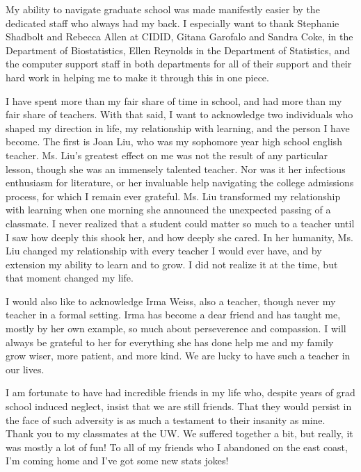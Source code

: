 {{   	My ability to navigate graduate school was made manifestly easier by the dedicated staff who always had my back. I especially want to thank Stephanie Shadbolt and Rebecca Allen at CIDID, Gitana Garofalo and Sandra Coke, in the Department of Biostatistics, Ellen Reynolds in the Department of Statistics, and the computer support staff in both departments for all of their support and their hard work in helping me to make it through this in one piece. 
   	
   	I have spent more than my fair share of time in school, and had more than my fair share of teachers. With that said, I want to acknowledge two individuals who shaped my direction in life, my relationship with learning, and the person I have become. The first is Joan Liu, who was my sophomore year high school english teacher. Ms. Liu's greatest effect on me was not the result of any particular lesson, though she was an immensely talented teacher. Nor was it her infectious enthusiasm for literature, or her invaluable help navigating the college admissions process, for which I remain ever grateful. Ms. Liu transformed my relationship with learning when one morning she announced the unexpected passing of a classmate. I never realized that a student could matter so much to a teacher until I saw how deeply this shook her, and how deeply she cared. In her humanity, Ms. Liu changed my relationship with every teacher I would ever have, and by extension my ability to learn and to grow. I did not realize it at the time, but that moment changed my life.
   	
   	I would also like to acknowledge Irma Weiss, also a teacher, though never my teacher in a formal setting. Irma has become a dear friend and has taught me, mostly by her own example, so much about perseverence and compassion. I will always be grateful to her for everything she has done help me and my family grow wiser, more patient, and more kind. We are lucky to have such a teacher in our lives.
   	
   	I am fortunate to have had incredible friends in my life who, despite years of grad school induced neglect, insist that we are still friends. That they would persist in the face of such adversity is as much a testament to their insanity as mine. Thank you to my classmates at the UW. We suffered together a bit, but really, it was mostly a lot of fun! To all of my friends who I abandoned on the east coast, I'm coming home and I've got some new stats jokes! 
   	
}}
